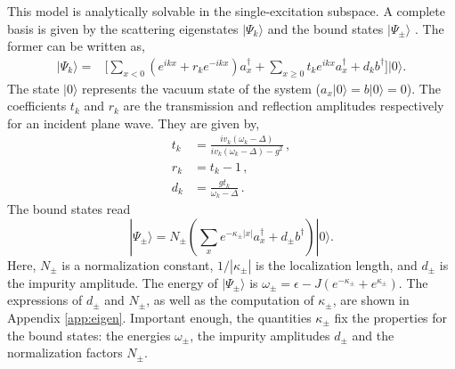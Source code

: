 \documentclass[aps,pra,twocolumn,floatfix,superscriptaddress]{revtex4-1}%
\begin{document}



This model is analytically solvable in the single-excitation subspace. A complete basis is given by the scattering eigenstates $|\Psi_k\rangle$ \cite{Nori2008a} and the bound states $|\Psi_\pm\rangle$ \cite{Longo2010,Longo2011}. The former can be written as,
\begin{align}
\label{eq:scattering_states} 
|\Psi_k\rangle = & \Big [ \sum_{x<0}(e^{ikx}+r_k e^{-ikx})a_x^\dagger 
 +  \sum_{x\geq 0} t_k e^{ikx} a_x^\dagger 
+ d_k b^\dagger \Big]  |0\rangle.
\end{align}
The state $|0\rangle$ represents the vacuum state of the system ($a_x|0\rangle=b|0\rangle = 0$).
The coefficients 
 $t_k$ and $r_k$ are the  
 transmission and reflection amplitudes respectively
for an incident plane wave.  They are given by, 
\begin{align}
\label{eq:transmission}
t_k & =\frac{iv_k(\omega_k - \Delta)}{iv_k(\omega_k-\Delta)-g^2} \, , 
\\
\label{eq:reflection}
r_k&=t_k-1\, ,
\\ 
d_k  &= \frac{g t_k}{\omega_k-\Delta} \,
\label{eq:d_scattering_states}.
\end{align} 
The bound states read
\begin{equation}
 |\Psi_\pm\rangle =  N_\pm \left(\sum_x e^{-\kappa_\pm |x|} a_x^\dagger + d_\pm b^\dagger\right)|0\rangle.\label{eq:bound_states}
\end{equation} 
Here, $N_\pm$ is a normalization constant, $1/|\kappa_\pm|$ is the localization length, and $d_\pm$ is  the impurity amplitude. The energy of $|\Psi_\pm\rangle$ is $\omega_\pm = \epsilon - J(e^{-\kappa_\pm} + e^{\kappa_\pm})$. The expressions of $d_\pm$ and $N_\pm$, as well as the computation of $\kappa_\pm$, are shown in Appendix \ref{app:eigen}. Important enough, the quantities $\kappa_\pm$ 
fix the properties for the bound states: the energies $\omega_\pm$, the impurity amplitudes $d_\pm$ and the normalization factors $N_\pm$.
\end{document}
